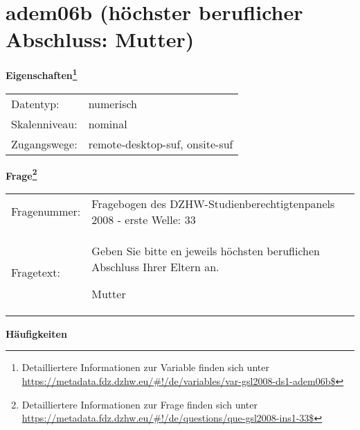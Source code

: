 
    \setcounter{footnote}{0}

    \vspace*{-1.8cm}
	\section{adem06b (höchster beruflicher Abschluss: Mutter)}
	\label{section:adem06b}



    \vspace*{0.5cm}
    \noindent\textbf{Eigenschaften\footnote{Detailliertere Informationen zur Variable finden sich unter
		\url{https://metadata.fdz.dzhw.eu/\#!/de/variables/var-gsl2008-ds1-adem06b$}}}\\
	\begin{tabularx}{\hsize}{@{}lX}
	Datentyp: & numerisch \\
	Skalenniveau: & nominal \\
	Zugangswege: &
	  remote-desktop-suf, 
	  onsite-suf
 \\
    \end{tabularx}



				\vspace*{0.5cm}
                \noindent\textbf{Frage\footnote{Detailliertere Informationen zur Frage finden sich unter
		              \url{https://metadata.fdz.dzhw.eu/\#!/de/questions/que-gsl2008-ins1-33$}}}\\
				\begin{tabularx}{\hsize}{@{}lX}
					Fragenummer: &
					  Fragebogen des DZHW-Studienberechtigtenpanels 2008 - erste Welle:
					  33
 \\
					Fragetext: & Geben Sie bitte en jeweils höchsten beruflichen Abschluss Ihrer Eltern an.\par  Mutter \\
				\end{tabularx}





        		\vspace*{0.5cm}
                \noindent\textbf{Häufigkeiten}

